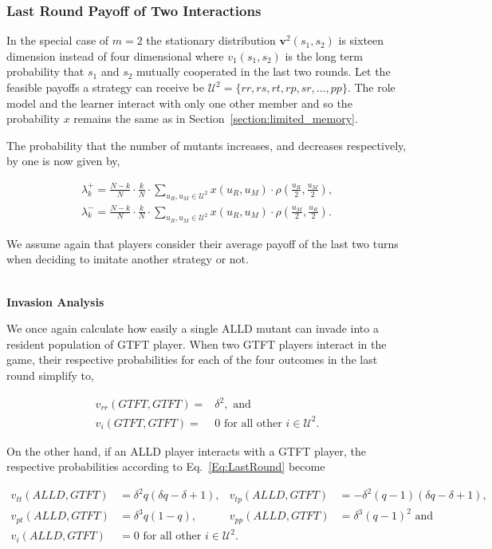 \documentclass[11pt]{article}
\theoremstyle{plainCl1}
\theoremstyle{plainCl2}
\begin{document}
\subsubsection{Last Round Payoff of Two Interactions}

In the special case of $m=2$ the stationary distribution \(\mathbf{v}^{2}(s_1,
s_2)\) is sixteen dimension instead of four dimensional where \(v_{1}(s_1, s_2)\) is
the long term probability that \(s_1\) and \(s_2\) mutually cooperated in the
last two rounds. Let the feasible payoffs a strategy can receive
be $\mathcal{U}^{2} = \{rr, rs, rt, rp, sr, \dots, pp\}$.
The role model and the learner interact with only one other member and so the
probability \(x\) remains the same as in Section~\ref{section:limited_memory}.

The probability that the number of mutants increases, and decreases respectively,
by one is now given by,

\begin{align}
\lambda^+_k=\frac{N\!-\!k}{N}\cdot \frac{k}{N} \cdot \sum_{u_{R},u_{M}\in\mathcal{U}^{2}} x(u_{R},u_{M})\cdot \rho\left(\frac{u_{R}}{2},\frac{u_{M}}{2}\right), \\
\lambda^-_k=\frac{N\!-\!k}{N}\cdot \frac{k}{N} \cdot \sum_{u_{R},u_{M}\in\mathcal{U}^{2}} x(u_{R},u_{M})\cdot \rho\left(\frac{u_{M}}{2},\frac{u_{R}}{2}\right).
\end{align}

We assume again that players consider their average payoff of the last two turns
when deciding to imitate another strategy or not.

~\\
{\bf Invasion Analysis}

We once again calculate how easily a single ALLD mutant can invade into a
resident population of GTFT player. When two GTFT players interact in the game,
their respective probabilities for each of the four outcomes in the last round
simplify to,

\begin{align*}
    v_{rr}(GTFT,GTFT) = & \delta^2, \text{ and }\\
    v_{i}(GTFT,GTFT) = &  0 \text{ for all other } i \in \mathcal{U}^{2}.
\end{align*}

On the other hand, if an ALLD player interacts with a GTFT player, the
respective probabilities according to Eq.~\ref{Eq:LastRound} become

\begin{align*}
    v_{tt} (ALLD,GTFT) & = \delta^{2} q \left(\delta q - \delta + 1\right), & 
    v_{tp}(ALLD,GTFT) & = - \delta^{2} \left(q - 1\right) \left(\delta q - \delta + 1\right), \\
    v_{pt} (ALLD, GTFT ) & = \delta^{3} q \left(1 - q\right), & 
    v_{pp} (ALLD, GTFT) & = \delta^{3} \left(q - 1\right)^{2} \text{ and }\\
    v_{i}(ALLD,GTFT) & =  0 \text{ for all other } i \in \mathcal{U}^{2}.
\end{align*}
\end{document}
